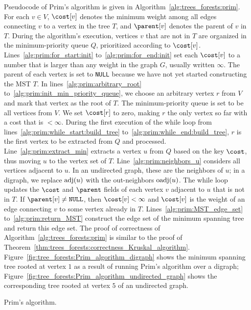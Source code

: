 Pseudocode of Prim's algorithm is given in
Algorithm~\ref{alg:trees_forests:prim}. For each $v \in V$, $\cost[v]$
denotes the minimum weight among all edges
connecting $v$ to a vertex in the tree $T$, and $\parent[v]$ denotes
the parent of $v$ in $T$. During the algorithm's execution, vertices
$v$ that are not in $T$ are organized in the
minimum-priority queue $Q$, prioritized
according to $\cost[v]$. Lines~\ref{alg:prim:for_start:init}
to~\ref{alg:prim:for_end:init} set each $\cost[v]$ to a number that
is larger than any weight in the graph $G$, usually written $\infty$.
The parent of each vertex is set to \texttt{NULL} because we have not
yet started constructing the MST $T$. In
lines~\ref{alg:prim:arbitrary_root}
to~\ref{alg:prim:init_min_priority_queue}, we choose an arbitrary
vertex $r$ from $V$ and mark that vertex as the root of $T$. The
minimum-priority queue is set to be all
vertices from $V$. We set $\cost[r]$ to zero, making $r$ the only
vertex so far with a cost that is $< \infty$. During the first
execution of the while loop from
lines~\ref{alg:prim:while_start:build_tree}
to~\ref{alg:prim:while_end:build_tree}, $r$ is the first vertex to be
extracted from $Q$ and processed. Line~\ref{alg:prim:extract_min}
extracts a vertex $u$ from $Q$ based on the key $\cost$, thus moving
$u$ to the vertex set of $T$. Line~\ref{alg:prim:neighbors_u}
considers all vertices adjacent to $u$. In an undirected graph, these
are the neighbors of $u$; in a digraph, we replace $\operatorname*{adj}(u)$ with the
out-neighbors $\operatorname*{oadj}(u)$. The while loop updates the $\cost$ and
$\parent$ fields of each vertex $v$ adjacent to $u$ that is not in
$T$. If $\parent[v] \neq \texttt{NULL}$, then $\cost[v] < \infty$ and
$\cost[v]$ is the weight of an edge connecting $v$ to some vertex
already in $T$. Lines~\ref{alg:prim:MST_edge_set}
to~\ref{alg:prim:return_MST} construct the edge set of the minimum
spanning tree and return this edge set. The proof of correctness of
Algorithm~\ref{alg:trees_forests:prim} is similar to the proof of
Theorem~\ref{thm:trees_forests:correctness_Kruskal_algorithm}.
Figure~\ref{fig:tree_forests:Prim_algorithm_digraph} shows the minimum
spanning tree rooted at vertex $1$ as a result of running Prim's
algorithm over a digraph;
Figure~\ref{fig:tree_forests:Prim_algorithm_undirected_graph} shows
the corresponding tree rooted at vertex $5$ of an undirected graph.

\begin{algorithm}[!htbp]

\caption{Prim's algorithm.}
\label{alg:trees_forests:prim}
\end{algorithm}

